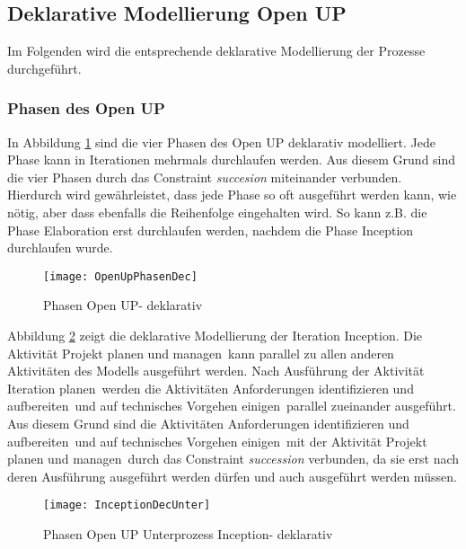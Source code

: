 \clearpage

\subsection{Deklarative Modellierung Open UP}

Im Folgenden wird die entsprechende deklarative Modellierung der Prozesse durchgeführt.

\subsubsection{Phasen des Open UP}


In Abbildung \ref{fig:OpenUpPhasenDec} sind die vier Phasen des Open UP deklarativ modelliert. Jede Phase kann in Iterationen mehrmals durchlaufen werden. Aus diesem Grund sind die vier Phasen durch das Constraint \textit{succesion} miteinander verbunden. Hierdurch wird gewährleistet, dass jede Phase so oft ausgeführt werden kann, wie nötig, aber dass ebenfalls die Reihenfolge eingehalten wird. So kann z.B. die Phase Elaboration erst durchlaufen werden, nachdem die Phase Inception durchlaufen wurde.
\begin{figure}[htp]
\begin{center}
  \texttt{[image: OpenUpPhasenDec]} %
  \caption{Phasen Open UP- deklarativ}
  \label{fig:OpenUpPhasenDec}
\end{center}
\end{figure}




Abbildung \ref{fig:InceptionDecUnter} zeigt die deklarative Modellierung der Iteration \grqq Inception\grqq. Die Aktivität \grqq Projekt planen und managen\grqq \  kann parallel zu allen anderen Aktivitäten des Modells ausgeführt werden.\newline
Nach Ausführung der Aktivität \grqq Iteration planen\grqq \ werden die Aktivitäten \grqq Anforderungen identifizieren und aufbereiten\grqq \ und \grqq auf technisches Vorgehen einigen\grqq \ parallel zueinander ausgeführt. Aus diesem Grund sind die Aktivitäten \grqq Anforderungen identifizieren und aufbereiten\grqq \ und \grqq auf technisches Vorgehen einigen\grqq \ mit der Aktivität \grqq Projekt planen und managen\grqq \ durch das Constraint \textit{succession} verbunden, da sie erst nach deren Ausführung ausgeführt werden dürfen und auch ausgeführt werden müssen. \newline

\begin{figure}[htp]
\begin{center}
  \texttt{[image: InceptionDecUnter]} %
  \caption{Phasen Open UP Unterprozess Inception- deklarativ}
  \label{fig:InceptionDecUnter}
\end{center}
\end{figure}

